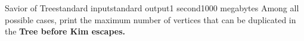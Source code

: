 \begin{problem}{Savior of Tree}{standard input}{standard output}{1 second}{1000 megabytes}
\OutputFile
Among all possible cases, print the maximum number of vertices that can be duplicated in the \bf{Tree} before Kim escapes.

\Examples

\begin{example}
%
%
%
\end{example}

\end{problem}

